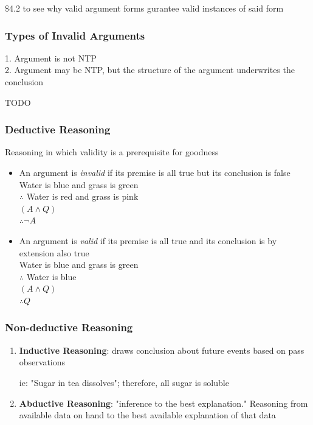 \documentclass[]{article}
\begin{document}
$\$$4.2 to see why valid argument forms gurantee valid instances of said form
\subsubsection{Types of Invalid Arguments}
1. Argument is not NTP\vspace{5pt}\\
2. Argument may be NTP, but the structure of the argument underwrites the conclusion

TODO
\subsubsection{Deductive Reasoning}
Reasoning in which validity is a prerequisite for goodness
\begin{itemize}
	\item{An argument is \textit{invalid} if its premise is all true but its conclusion is false\vspace{5pt}\\Water is blue and grass is green\\ 
	$\therefore$ Water is red and grass is pink\vspace{5pt}\\
	$(A \wedge Q)$\\
	$\therefore \neg{A}$}
	\item{An argument is \textit{valid} if its premise is all true and its conclusion is by extension also true\vspace{5pt}\\Water is blue and grass is green\\ $\therefore$ Water is blue\vspace{5pt}\\
	$(A \wedge Q)$\\
	$\therefore {Q}$}
\end{itemize}
\subsubsection{Non-deductive Reasoning}
\begin{enumerate}
	\item{\textbf{Inductive Reasoning}:
		draws conclusion about future events based on pass observations
		
		ie: "Sugar in tea dissolves"; therefore, all sugar is soluble	}
	\item{\textbf{Abductive Reasoning}:
		"inference to the best explanation."
		Reasoning from available data on hand to the best available explanation of that data}
\end{enumerate}
\end{document}
